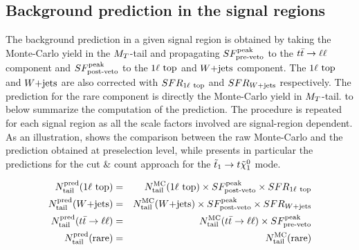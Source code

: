         \subsection{Background prediction in the signal regions}

        The background prediction in a given signal region is obtained by taking the Monte-Carlo
        yield in the $M_T$-tail and propagating $SF_{\text{pre-veto}}^{\text{peak}}$ to the $t\bar{t} \rightarrow \ell \ell$ component and $SF_{\text{post-veto}}^{\text{peak}}$
        to the $1\ell~\text{top}$ and $\text{$W$+jets}$ component. The $1\ell~\text{top}$ and $\text{$W$+jets}$
        are also corrected with $SFR_{1\ell~\text{top}}$ and $SFR_{\text{$W$+jets}}$ respectively. The
        prediction for the rare component is directly the Monte-Carlo yield in $M_T$-tail.
         to  below summarize
        the computation of the prediction. The procedure is repeated for each signal
        region as all the scale factors involved are signal-region dependent. As an
        illustration, 
        shows the comparison between the raw Monte-Carlo and the prediction obtained at
        preselection level, while  presents in particular
        the predictions for the cut \& count approach for the
        $\tilde{t}_1 \rightarrow t \tilde{\chi}_1^0$ mode.

        \begin{eqnarray}
            N^\text{pred}_\text{tail}(1\ell~\text{top}) & = & N^\text{MC}_\text{tail}(1\ell~\text{top})  \times SF_{\text{post-veto}}^{\text{peak}} \times SFR_{1\ell~\text{top}} \label{eq:prediction1ltop}  \\
            N^\text{pred}_\text{tail}(\text{$W$+jets})        & = & N^\text{MC}_\text{tail}(\text{$W$+jets})         \times SF_{\text{post-veto}}^{\text{peak}}  \times SFR_{\text{$W$+jets}}                             \\
            N^\text{pred}_\text{tail}(t\bar{t} \rightarrow \ell \ell)  & = & N^\text{MC}_\text{tail}(t\bar{t} \rightarrow \ell \ell)   \times SF_{\text{pre-veto}}^{\text{peak}}                                                \\
            N^\text{pred}_\text{tail}(\text{rare})   & = & N^\text{MC}_\text{tail}(\text{rare})                                           \label{eq:predictionrare}
        \end{eqnarray}

